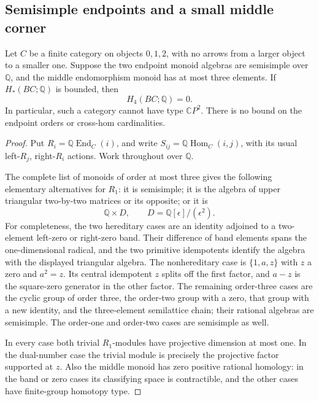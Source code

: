 \subsection{Semisimple endpoints and a small middle corner}

\begin{proposition}\label{C:semisimple-ends-small-middle}
Let $C$ be a finite category on objects $0,1,2$, with no arrows
from a larger object to a smaller one.  Suppose the two endpoint
monoid algebras are semisimple over $\mathbb Q$, and the middle
endomorphism monoid has at most three elements.  If
$H_*(BC;\mathbb Q)$ is bounded, then
\[
 H_4(BC;\mathbb Q)=0.
\]
In particular, such a category cannot have type $\mathbb CP^2$.
There is no bound on the endpoint orders or cross-hom cardinalities.
\end{proposition}
\begin{proof}
Put $R_i=\mathbb Q\operatorname{End}_C(i)$, and write
$S_{ij}=\mathbb Q\operatorname{Hom}_C(i,j)$, with its usual
left-$R_j$, right-$R_i$ actions.  Work throughout over
$\mathbb Q$.

The complete list of monoids of order at most three gives the
following elementary alternatives for $R_1$: it is semisimple;
it is the algebra of upper triangular two-by-two matrices or its
opposite; or it is
\[
 \mathbb Q\times D,\qquad D=\mathbb Q[\epsilon]/(\epsilon^2).
\]
For completeness, the two hereditary cases are an identity
adjoined to a two-element left-zero or right-zero band.  Their
difference of band elements spans the one-dimensional radical,
and the two primitive idempotents identify the algebra with the
displayed triangular algebra.  The nonhereditary case is
$\{1,a,z\}$ with $z$ a zero and $a^2=z$.  Its central
idempotent $z$ splits off the first factor, and $a-z$ is the
square-zero generator in the other factor.  The remaining
order-three cases are the cyclic group of order three, the
order-two group with a zero, that group with a new identity,
and the three-element semilattice chain; their rational
algebras are semisimple.  The order-one and order-two cases
are semisimple as well.

In every case both trivial $R_1$-modules have projective
dimension at most one.  In the dual-number case the trivial
module is precisely the projective factor supported at $z$.
Also the middle monoid has zero positive rational homology:
in the band or zero cases its classifying space is contractible,
and the other cases have finite-group homotopy type.


\end{proof}
